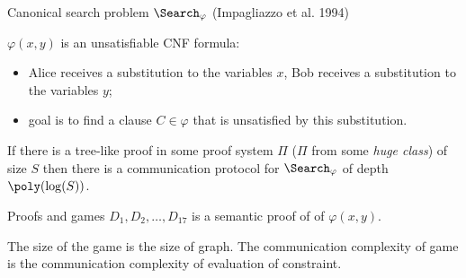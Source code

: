 \begin{frame}{Canonical search problem $\Search_{\varphi}$ (Impagliazzo et al. 1994)}

	
    $\varphi(x, y)$ is an unsatisfiable CNF formula:
    \begin{itemize}
        \item Alice receives a substitution to the variables $x$, Bob receives a substitution to the
            variables $y$;
        \item goal is to find a clause $C \in \varphi$ that is unsatisfied by this substitution.
    \end{itemize}

    \pause

    \begin{theorem}
        If there is a {\color{blue} tree-like} proof in some proof system $\Pi$ ($\Pi$ from some
        \textit{huge class}) of size $S$ then there is a communication protocol for $\Search_{\varphi}$
        of depth $\poly(\log(S))$.
    \end{theorem}
    
\end{frame}


\begin{frame}{Proofs and games}
	$D_1, D_2, \dots, D_{17}$ is a semantic proof of of $\varphi(x, y)$.

    \begin{center}
    	    
    \end{center}

    \pause
    \pause
    \pause
    \pause
    \pause
    \pause
    \pause
    \pause
    \pause
    The size of the game is the size of graph. The communication complexity of game is the communication
    complexity of evaluation of constraint.

\end{frame}




